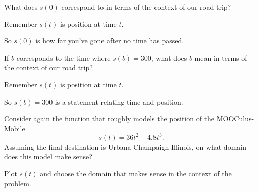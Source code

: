 \documentclass{ximera}
\begin{document}
\begin{problem} %
What does $s(0)$ correspond to in terms of the context of our road
trip?
\begin{hint}
Remember $s(t)$ is position at time $t$.
\end{hint}
\begin{hint}
So $s(0)$ is how far you've gone after no time has passed. 
\end{hint}
\begin{prompt} %
  \begin{multipleChoice}
  \end{multipleChoice}
\end{prompt}
\end{problem}

\begin{problem} %
If $b$ corresponds to the time where $s(b) = 300$, what does $b$ mean
in terms of the context of our road trip?
\begin{hint}
Remember $s(t)$ is position at time $t$.
\end{hint}
\begin{hint}
So $s(b)=300$ is a statement relating time and position.  
\end{hint}
\begin{prompt} %
  \begin{multipleChoice}
  \end{multipleChoice}
\end{prompt}
\end{problem}


\begin{problem} %
Consider again the function that roughly models the position of the
MOOCulus-Mobile
\[
s(t) = 36t^2 -4.8t^3.
\]
Assuming the final destination is Urbana-Champaign Illinois, on what
domain does this model make sense?
\begin{hint}
  Plot $s(t)$ and choose the domain that makes sense in the context of
  the problem.
\end{hint}
\end{problem}
\end{document}
